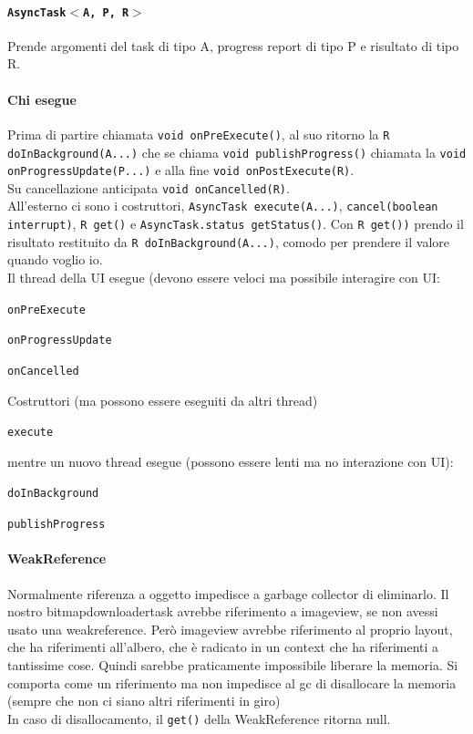 \documentclass[10pt]{book}
\begin{document}
\paragraph{\texttt{AsyncTask$<$A, P, R$>$}} Prende argomenti del task di tipo A, progress report di tipo P e risultato di tipo R.
\paragraph{Chi esegue} Prima di partire chiamata \texttt{void onPreExecute()}, al suo ritorno la \texttt{R doInBackground(A...)} che se chiama \texttt{void publishProgress()} chiamata la \texttt{void onProgressUpdate(P...)} e alla fine \texttt{void onPostExecute(R)}.\\
Su cancellazione anticipata \texttt{void onCancelled(R)}.\\
All'esterno ci sono i costruttori, \texttt{AsyncTask execute(A...)}, \texttt{cancel(boolean interrupt)}, \texttt{R get()} e \texttt{AsyncTask.status getStatus()}. Con \texttt{R get())} prendo il risultato restituito da \texttt{R doInBackground(A...)}, comodo per prendere il valore quando voglio io.\\
Il thread della UI esegue (devono essere veloci ma possibile interagire con UI:
\begin{list}{}{}
	\item \texttt{onPreExecute}
	\item \texttt{onProgressUpdate}
	\item \texttt{onCancelled}
	\item Costruttori (ma possono essere eseguiti da altri thread)
	\item \texttt{execute}
\end{list}
mentre un nuovo thread esegue (possono essere lenti ma no interazione con UI):
\begin{list}{}{}
	\item \texttt{doInBackground}
	\item \texttt{publishProgress}
\end{list}
\paragraph{WeakReference} Normalmente riferenza a oggetto impedisce a garbage collector di eliminarlo. Il nostro bitmapdownloadertask avrebbe riferimento a imageview, se non avessi usato una weakreference. Però imageview avrebbe riferimento al proprio layout, che ha riferimenti all'albero, che è radicato in un context che ha riferimenti a tantissime cose. Quindi sarebbe praticamente impossibile liberare la memoria. Si comporta come un riferimento ma non impedisce al gc di disallocare la memoria (sempre che non ci siano altri riferimenti in giro)\\
In caso di disallocamento, il \texttt{get()} della WeakReference ritorna null.
\end{document}
